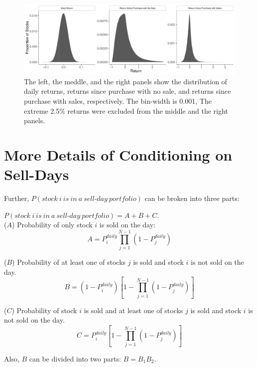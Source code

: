 \documentclass[11pt, a4paper]{article}
\begin{document}
\begin{appendices}
\begin{figure}[H]
	\centering
	\includegraphics[width=1\columnwidth]{return_dist.pdf}
	\caption{The left, the meddle, and the right panels show the distribution of daily returns, returns since purchase with no sale, and returns since purchase with sales, respectively. The bin-width is 0.001, The extreme 2.5\% returns were excluded from the middle and the right panels.}
	\label{figure:ret}
\end{figure}

\clearpage
\section{More Details of Conditioning on Sell-Days}
\label{section:more_details}

Further, $P(stock~i~is~in~a~sell\mbox{-}day~portfolio)$ can be broken into three parts:

$P(stock~i~is~in~a~sell\mbox{-}day~portfolio) = A+B+C$.\\

\noindent
($A$) Probability of only stock $i$ is sold on the day: 
\begin{equation}
\label{eq:A}
A = P^{daily}_{i}\prod_{j=1}^{N-1}(1-P^{daily}_{j})
\end{equation}


\noindent
($B$) Probability of at least one of stocks $j$ is sold and stock $i$ is not sold on the day.
\begin{equation}
\label{eq:B}
B = (1-P^{daily}_{i})[1-\prod_{j=1}^{N-1}(1-P^{daily}_{j})]
\end{equation}

\noindent
($C$) Probability of stock $i$ is sold and at least one of stocks $j$ is sold and stock $i$ is not sold on the day.
\begin{equation}
\label{eq:C}
C = P^{daily}_{i}[1-\prod_{j=1}^{N-1}(1-P^{daily}_{j})]
\end{equation}

Also, $B$ can be divided into two parts: $B=B_1B_2$.\\


\end{appendices}
\end{document}
